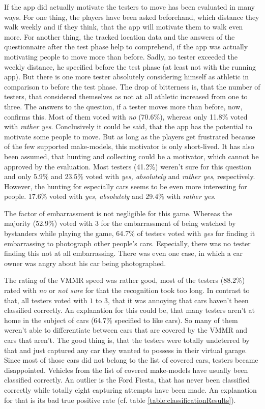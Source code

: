 If the app did actually motivate the testers to move has been evaluated in many ways. For one thing, the players have been asked beforehand, which distance they walk weekly and if they think, that the app will motivate them to walk even more. For another thing, the tracked location data and the answers of the questionnaire after the test phase help to comprehend, if the app was actually motivating people to move more than before. Sadly, no tester exceeded the weekly distance, he specified before the test phase (at least not with the running app). But there is one more tester absolutely considering himself as athletic in comparison to before the test phase. The drop of bitterness is, that the number of testers, that considered themselves as not at all athletic increased from one to three. The answers to the question, if a tester moves more than before, now, confirms this. Most of them voted with \emph{no} (70.6\%), whereas only 11.8\% voted with \emph{rather yes}. Conclusively it could be said, that the app has the potential to motivate some people to move. But as long as the players get frustrated because of the few supported make-models, this motivator is only short-lived. It has also been assumed, that hunting and collecting could be a motivator, which cannot be approved by the evaluation. Most testers (41.2\%) weren't sure for this question and only 5.9\% and 23.5\% voted with \emph{yes, absolutely} and \emph{rather yes}, respectively. However, the hunting for especially cars seems to be even more interesting for people. 17.6\% voted with \emph{yes, absolutely} and 29.4\% with \emph{rather yes}.

The factor of embarrassment is not negligible for this game. Whereas the majority (52.9\%) voted with $3$ for the embarrassment of being watched by bystanders while playing the game, 64.7\% of testers voted with \emph{yes} for finding it embarrassing to photograph other people's cars. Especially, there was no tester finding this not at all embarrassing. There was even one case, in which a car owner was angry about his car being photographed.

The rating of the VMMR speed was rather good, most of the testers (88.2\%) rated with \emph{no} or \emph{not sure} for that the recognition took too long. In contrast to that, all testers voted with $1$ to $3$, that it was annoying that cars haven't been classified correctly. An explanation for this could be, that many testers aren't at home in the subject of cars (64.7\% specified to like cars). So many of them weren't able to differentiate between cars that are covered by the VMMR and cars that aren't. The good thing is, that the testers were totally undeterred by that and just captured any car they wanted to possess in their virtual garage. Since most of those cars did not belong to the list of covered cars, testers became disappointed. Vehicles from the list of covered make-models have usually been classified correctly. An outlier is the Ford Fiesta, that has never been classified correctly while totally eight capturing attempts have been made. An explanation for that is its bad true positive rate (cf. table \ref{table:classificationResults}).

